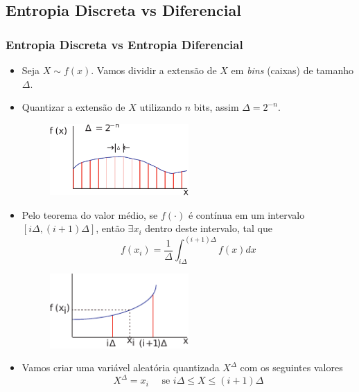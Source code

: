 \subsection{Entropia Discreta vs Diferencial}
\begin{frame}[allowframebreaks]
  \frametitle{Entropia Discreta vs Entropia Diferencial}
  \begin{itemize}
  \item Seja $X \sim f(x)$. Vamos dividir a extensão de $X$ em \textit{bins} (caixas) de tamanho $\Delta$.
  \item Quantizar a extensão de $X$ utilizando $n$ bits, assim $\Delta = 2^{-n}$.
                \begin{figure}[h!]
                \centering
                \includegraphics[width=0.5\textwidth]{images/xbins.pdf}
                \label{fig:xbins}
                \end{figure}
  \item Pelo teorema do valor médio, se $f(\cdot)$ é contínua em um intervalo $[i\Delta, (i+1)\Delta]$, então $\exists x_i$
	dentro deste intervalo, tal que
	\begin{equation}
	f(x_i) = \frac{1}{\Delta} \int_{i\Delta}^{(i+1)\Delta} f(x) dx
	\end{equation}
                \begin{figure}[h!]
                \centering
                \includegraphics[width=0.5\textwidth]{images/teovalmed.pdf}
                \label{fig:teovalmed}
                \end{figure}
  \item Vamos criar uma variável aleatória quantizada $X^\Delta$ com os seguintes valores
	\begin{equation}
	X^\Delta = x_i \quad \text{ se } i \Delta \leq X \leq (i+1) \Delta

\end{equation}
\end{itemize}
\end{frame}
